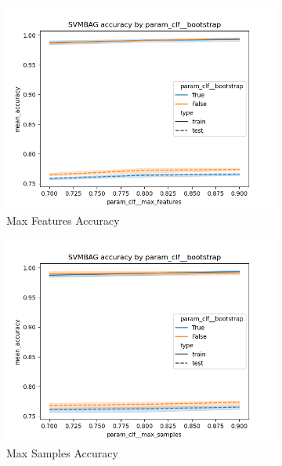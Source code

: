 \documentclass[12pt]{article}
\begin{document}
\begin{figure}
  \begin{subfigure}{.5\textwidth}
      \includegraphics[width=.95\textwidth]{../../results/SVMbag/param_clf__bootstrap_accuracy_param_clf__max_features.png}
      \caption{Max Features Accuracy}
      \end{subfigure}%
    \begin{subfigure}{.5\textwidth}
      \includegraphics[width=.95\textwidth]{../../results/SVMbag/param_clf__bootstrap_accuracy_param_clf__max_samples.png}
      \caption{Max Samples Accuracy}
    \end{subfigure}
    \begin{subfigure}{.5\textwidth}

\end{subfigure}
\end{figure}
\end{document}
